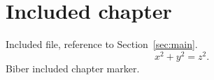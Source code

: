 \section{Included chapter}\label{sec:chapter}
Included file, reference to Section~\ref{sec:main}.
\begin{equation}x^2+y^2=z^2.\label{eq:identity}\end{equation}
Biber included chapter marker.
